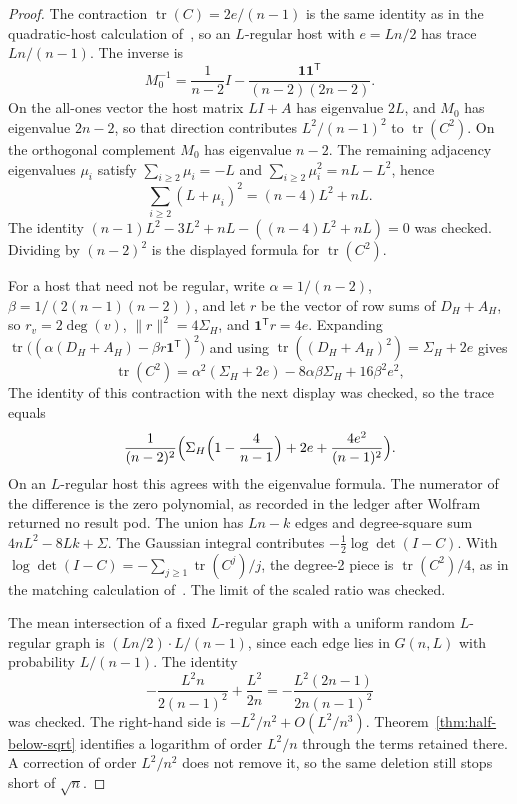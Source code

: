 \documentclass[11pt]{article}
\begin{document}
\begin{proof}
The contraction \(\operatorname{tr}(C)=2e/(n-1)\) is the same identity as in the
quadratic-host calculation of~\cite{PlusOneV1}, so an \(L\)-regular host with
\(e=Ln/2\) has trace \(Ln/(n-1)\).
The inverse is
\[
M_0^{-1}
=
\frac1{n-2}I-\frac{\mathbf{1}\mathbf{1}^{\mathsf T}}{(n-2)(2n-2)}.
\]
On the all-ones vector the host matrix \(LI+A\) has eigenvalue \(2L\), and
\(M_0\) has eigenvalue \(2n-2\), so that direction contributes
\(L^2/(n-1)^2\) to \(\operatorname{tr}(C^2)\).
On the orthogonal complement \(M_0\) has eigenvalue \(n-2\).
The remaining adjacency eigenvalues \(\mu_i\) satisfy
\(\sum_{i\ge 2}\mu_i=-L\) and \(\sum_{i\ge 2}\mu_i^2=nL-L^2\), hence
\[
\sum_{i\ge 2}(L+\mu_i)^2=(n-4)L^2+nL.
\]
The identity \((n-1)L^2-3L^2+nL-((n-4)L^2+nL)=0\) was checked.
Dividing by \((n-2)^2\) is the displayed formula for \(\operatorname{tr}(C^2)\).

For a host that need not be regular, write \(\alpha=1/(n-2)\),
\(\beta=1/(2(n-1)(n-2))\), and let \(r\) be the vector of row sums of
\(D_H+A_H\), so \(r_v=2\deg(v)\), \(\|r\|^2=4\Sigma_H\), and
\(\mathbf{1}^{\mathsf T}r=4e\).
Expanding \(\operatorname{tr}\bigl((\alpha(D_H+A_H)-\beta r\mathbf{1}^{\mathsf T})^2\bigr)\)
and using \(\operatorname{tr}((D_H+A_H)^2)=\Sigma_H+2e\) gives
\[
\operatorname{tr}(C^2)
=
\alpha^2(\Sigma_H+2e)-8\alpha\beta\Sigma_H+16\beta^2 e^2,
\]
The identity of this contraction with
the next display was checked, so the trace equals
\[
\frac1{(n-2)^2}
\Bigl(
\Sigma_H\Bigl(1-\frac4{n-1}\Bigr)+2e+\frac{4e^2}{(n-1)^2}
\Bigr).
\]
On an \(L\)-regular host this agrees with the eigenvalue formula.
The numerator of the difference is the zero polynomial, as recorded in the
ledger after Wolfram returned no result pod.
The union has \(Ln-k\) edges and degree-square sum \(4nL^2-8Lk+\Sigma\).
The Gaussian integral contributes \(-\frac12\log\det(I-C)\).
With \(\log\det(I-C)=-\sum_{j\ge 1}\operatorname{tr}(C^j)/j\), the degree-2 piece
is \(\operatorname{tr}(C^2)/4\), as in the matching calculation of~\cite{PlusOneV1}.
The limit of the scaled ratio was checked.

The mean intersection of a fixed \(L\)-regular graph with a uniform random
\(L\)-regular graph is \((Ln/2)\cdot L/(n-1)\), since each edge lies in
\(G(n,L)\) with probability \(L/(n-1)\).
The identity
\[
-\frac{L^2 n}{2(n-1)^2}+\frac{L^2}{2n}
=
-\frac{L^2(2n-1)}{2n(n-1)^2}
\]
was checked.
The right-hand side is \(-L^2/n^2+O(L^2/n^3)\).
Theorem~\ref{thm:half-below-sqrt} identifies a logarithm of order \(L^2/n\)
through the terms retained there.
A correction of order \(L^2/n^2\) does not remove it, so the same deletion still
stops short of \(\sqrt{n}\).
\end{proof}
\end{document}
